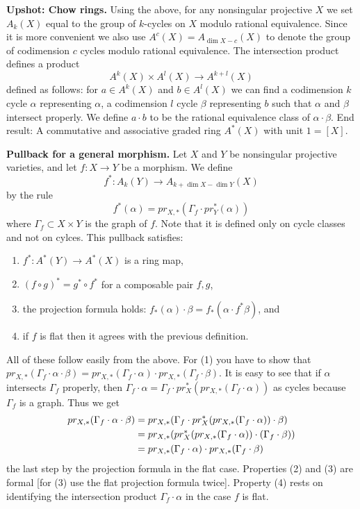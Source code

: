 \medskip\noindent
{\bf Upshot: Chow rings.} Using the above, for any nonsingular
projective $X$ we set $A_k(X)$ equal to the group of $k$-cycles
on $X$ modulo rational equivalence. Since it is more convenient
we also use $A^c(X)=A_{\dim X -c}(X)$ to denote the group of
codimension $c$ cycles modulo rational equivalence. The intersection product
defines a product
$$
A^k(X) \times A^l(X) \longrightarrow A^{k+l}(X)
$$
defined as follows: for $a \in A^k(X)$ and $b \in A^l(X)$
we can find a codimension $k$ cycle $\alpha$ representing $\alpha$,
a codimension $l$ cycle $\beta$ representing $b$ such that $\alpha$
and $\beta$ intersect properly.
We define $a\cdot b$ to be the rational equivalence
class of $\alpha \cdot \beta$. End result: A commutative and associative
graded ring $A^*(X)$ with unit $1=[X]$.

\medskip\noindent
{\bf Pullback for a general morphism.} 
Let $X$ and $Y$ be nonsingular projective varieties,
and let $f : X \to Y$ be a morphism. We define 
$$
f^* : A_k(Y) \to A_{k+\dim X - \dim Y}(X)
$$
by the rule
$$
f^*(\alpha) = pr_{X,*}(\Gamma_f \cdot pr_{Y}^*(\alpha))
$$
where $\Gamma_f \subset X\times Y$ is the graph of $f$.
Note that it is defined only on cycle classes and not
on cylces. This pullback satisfies:
\begin{enumerate}
\item $f^* : A^*(Y) \to A^*(X)$ is a ring map,
\item $(f \circ g)^* = g^* \circ f^*$ for a composable
pair $f,g$,
\item the projection formula holds: $f_*(\alpha) \cdot \beta =
f_*( \alpha \cdot f^*\beta)$, and
\item if $f$ is flat then it agrees with the previous definition.
\end{enumerate}

\medskip\noindent
All of these follow easily from the above. For (1) you have to show that
$pr_{X,*}( \Gamma_f \cdot \alpha \cdot \beta) =
pr_{X,*}(\Gamma_f \cdot \alpha) \cdot
pr_{X,*}(\Gamma_f \cdot \beta)$. It is easy to see that
if $\alpha$ intersects $\Gamma_f$ properly, then
$\Gamma_f \cdot \alpha =  
\Gamma_f \cdot pr_X^*(pr_{X,*}(\Gamma_f \cdot \alpha))$ as cycles
because $\Gamma_f$ is a graph. Thus we get
\begin{align}
pr_{X,*}( \Gamma_f \cdot \alpha \cdot \beta) & =
pr_{X,*}( \Gamma_f \cdot
pr_X^*(pr_{X,*}(\Gamma_f \cdot \alpha)) \cdot \beta) \\
& = pr_{X,*}( pr_X^*(pr_{X,*}(\Gamma_f \cdot \alpha))
\cdot (\Gamma_f \cdot \beta)) \cr
& = pr_{X,*}(\Gamma_f \cdot \alpha) \cdot pr_{X,*}(\Gamma_f \cdot \beta)
\end{align}
the last step by the projection formula in the flat case. Properties
(2) and (3) are formal [for (3) use the flat projection formula twice].
Property (4) rests on identifying the intersection product
$\Gamma_f \cdot \alpha$ in the case $f$ is flat.

